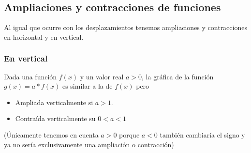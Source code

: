 \documentclass[a4paper,11pt,answers]{exam}
\begin{document}
\subsection{Ampliaciones y contracciones de funciones}
Al igual que ocurre con los desplazamientos tenemos ampliaciones y contracciones en horizontal y en vertical.
\subsubsection{En vertical}
Dada una función $f(x)$ y un valor real $a>0$, la gráfica de la función $g(x) = a*f(x)$ es similar a la de $f(x)$ pero
\begin{itemize}
	\item Ampliada verticalmente si $a>1$.
	\item Contraída verticalmente su $0<a<1$
\end{itemize}
(Únicamente tenemos en cuenta $a>0$ porque $a<0$ también cambiaría el signo y ya no sería exclusivamente una ampliación o contracción)
\end{document}
